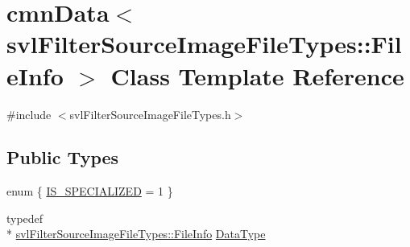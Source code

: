\hypertarget{classcmn_data_3_01svl_filter_source_image_file_types_1_1_file_info_01_4}{\section{cmn\-Data$<$ svl\-Filter\-Source\-Image\-File\-Types\-:\-:File\-Info $>$ Class Template Reference}
\label{classcmn_data_3_01svl_filter_source_image_file_types_1_1_file_info_01_4}
}


{\ttfamily \#include $<$svl\-Filter\-Source\-Image\-File\-Types.\-h$>$}

\subsection*{Public Types}
\begin{DoxyCompactItemize}
\item 
enum \{ \hyperlink{classcmn_data_3_01svl_filter_source_image_file_types_1_1_file_info_01_4_a1ec72b87a0793ade498bfd3e14174044af3dc5aa1649ab709ce8e3af7ba3a87ca}{I\-S\-\_\-\-S\-P\-E\-C\-I\-A\-L\-I\-Z\-E\-D} = 1
 \}
\item 
typedef \\*
\hyperlink{classsvl_filter_source_image_file_types_1_1_file_info}{svl\-Filter\-Source\-Image\-File\-Types\-::\-File\-Info} \hyperlink{classcmn_data_3_01svl_filter_source_image_file_types_1_1_file_info_01_4_a7f361877e8e81eb1bc2e3b091eb5f7a9}{Data\-Type}
\end{DoxyCompactItemize}
